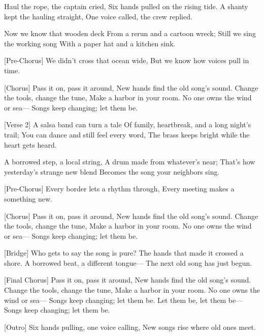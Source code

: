 \begin{lyrics}
[Verse 1]
Haul the rope, the captain cried,
Six hands pulled on the rising tide.
A shanty kept the hauling straight,
One voice called, the crew replied.

Now we know that wooden deck
From a rerun and a cartoon wreck;
Still we sing the working song
With a paper hat and a kitchen sink.

[Pre-Chorus]
We didn’t cross that ocean wide,
But we know how voices pull in time.

[Chorus]
Pass it on, pass it around,
New hands find the old song’s sound.
Change the tools, change the tune,
Make a harbor in your room.
No one owns the wind or sea—
Songs keep changing; let them be.

[Verse 2]
A salsa band can turn a tale
Of family, heartbreak, and a long night’s trail;
You can dance and still feel every word,
The brass keeps bright while the heart gets heard.

A borrowed step, a local string,
A drum made from whatever’s near;
That’s how yesterday’s strange new blend
Becomes the song your neighbors sing.

[Pre-Chorus]
Every border lets a rhythm through,
Every meeting makes a something new.

[Chorus]
Pass it on, pass it around,
New hands find the old song’s sound.
Change the tools, change the tune,
Make a harbor in your room.
No one owns the wind or sea—
Songs keep changing; let them be.

[Bridge]
Who gets to say the song is pure?
The hands that made it crossed a shore.
A borrowed beat, a different tongue—
The next old song has just begun.

[Final Chorus]
Pass it on, pass it around,
New hands find the old song’s sound.
Change the tools, change the tune,
Make a harbor in your room.
No one owns the wind or sea—
Songs keep changing; let them be.
Let them be, let them be—
Songs keep changing; let them be.

[Outro]
Six hands pulling, one voice calling,
New songs rise where old ones meet.
\end{lyrics}

